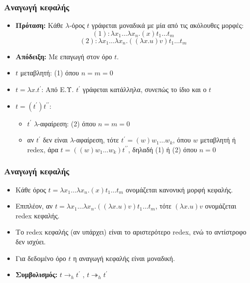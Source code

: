 \documentclass{beamer}
\begin{document}
\begin{frame}
  \frametitle{Αναγωγή κεφαλής}
  \begin{itemize}
  \item \textbf{Πρόταση:} Κάθε $\lambda$-όρος $t$ γράφεται μοναδικά με
    μία από τις ακόλουθες μορφές:
    $$(1): \lambda x_1 \ldots \lambda x_n . (x) t_1 \ldots t_m$$ 
    $$(2): \lambda x_1 \ldots \lambda x_n . ((\lambda x . u) v) t_1
    \ldots t_m$$ \pause
  \item \textbf{Απόδειξη:} Με επαγωγή στον όρο $t$.
  \item $t$ μεταβλητή: (1) όπου $n=m=0$ \pause
  \item $t = \lambda x . t^\prime$: Από Ε.Υ. $t^\prime$ γράφεται
    κατάλληλα, συνεπώς το ίδιο και ο $t$ \pause
  \item $t = (t^\prime) t^{\prime \prime}$:
    \begin{itemize}
    \item $t^\prime$ $\lambda$-αφαίρεση: (2) όπου $n=m=0$ \pause
    \item αν $t^\prime$ δεν είναι $\lambda$-αφαίρεση, τότε $t^\prime =
      (w) w_1 \ldots w_k$, όπου $w$ μεταβλητή ή redex, άρα $t = ((w)
      w_1 \ldots w_k) t^{\prime \prime}$, δηλαδή (1) ή (2) όπου $n=0$
    \end{itemize}
  \end{itemize}
\end{frame}

\begin{frame}
  \frametitle{Αναγωγή κεφαλής}
  \begin{itemize}
  \item Κάθε όρος $t = \lambda x_1 \ldots \lambda x_n . (x) t_1 \ldots
    t_m$ ονομάζεται κανονική μορφή κεφαλής.\pause
  \item Επιπλέον, αν $t = \lambda x_1 \ldots \lambda x_n . ((\lambda x
    . u) v) t_1 \ldots t_m$, τότε $(\lambda x . u) v$ ονομάζεται redex
    κεφαλής.\pause
  \item Το redex κεφαλής (αν υπάρχει) είναι το αριστερότερο redex, ενώ
    το αντίστροφο δεν ισχύει.\pause
  \item Για δεδομένο όρο $t$ η αναγωγή κεφαλής είναι μοναδική.
  \item \textbf{Συμβολισμός:} $t \rightarrow _h t^\prime$ , $t
    \twoheadrightarrow _h t^\prime$
  \end{itemize}
\end{frame}
\end{document}
